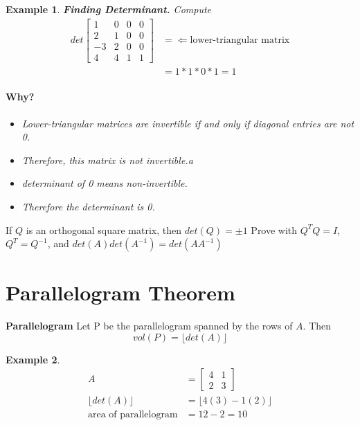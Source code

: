 \documentclass[12pt]{amsart}
\newtheorem{example}{Example}      %
\numberwithin{equation}{theorem}    %
\begin{document}
\begin{example}\textbf{Finding Determinant.}
    Compute \begin{align*}
        det \begin{bmatrix}
            1  & 0 & 0 & 0 \\
            2  & 1 & 0 & 0 \\
            -3 & 2 & 0 & 0 \\
            4  & 4 & 1 & 1
        \end{bmatrix} & = \Leftarrow \text{lower-triangular matrix} \\
                                       & = 1*1*0*1 = 1
    \end{align*}

    \paragraph{Why?}
    \begin{itemize}
        \item Lower-triangular matrices are invertible if and only if diagonal entries are not 0.
        \item Therefore, this matrix is not invertible.a
        \item determinant of 0 means non-invertible.
        \item Therefore the determinant is 0.
    \end{itemize}
\end{example}

\begin{theorem}
    If $Q$ is an orthogonal square matrix, then $det(Q)=\pm 1$
    Prove with $Q^{T}Q=I$, $Q^{T}=Q^{-1}$, and $det(A)det(A^{-1}) = det(AA^{-1})$
\end{theorem}

\section{Parallelogram Theorem}

\begin{theorem}
    \textbf{Parallelogram}
    Let P be the parallelogram spanned by the rows of $A$. Then
    \begin{equation}
        vol(P) = \lfloor det(A) \rfloor
    \end{equation}
\end{theorem}

\begin{example}
    \begin{align*}
        A                            & = \begin{bmatrix}
            4 & 1 \\
            2 & 3
        \end{bmatrix}  \\
        \lfloor det(A) \rfloor       & = \lfloor 4(3) - 1(2) \rfloor \\
        \text{area of parallelogram} & = 12 - 2 = 10
    \end{align*}
\end{example}
\end{document}
